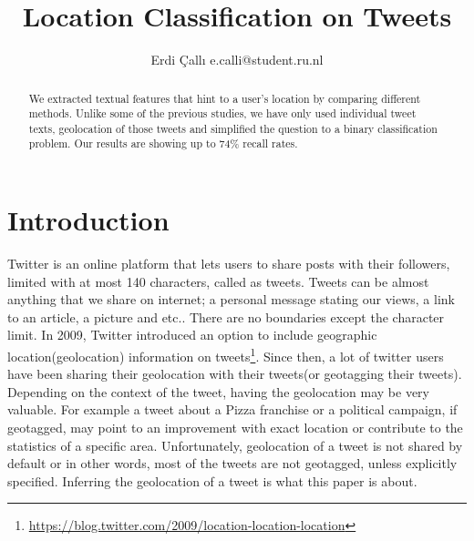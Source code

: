 \documentclass[twoside,11pt]{article}
\begin{document}
\title{Location Classification on Tweets}
\author{\name Erdi \c{C}all{\i}  \email e.calli@student.ru.nl}
\maketitle
\begin{abstract}

We extracted textual features that hint to a user's location by comparing different methods. Unlike some of the previous studies, we have only used individual tweet texts, geolocation of those tweets and simplified the question to a binary classification problem. Our results are showing up to 74\% recall rates.


\end{abstract}


\section{Introduction}

Twitter is an online platform that lets users to share posts with their followers, limited with at most 140 characters, called as tweets. Tweets can be almost anything that we share on internet; a personal message stating our views, a link to an article, a picture and etc.. There are no boundaries except the character limit. In 2009, Twitter introduced an option to include geographic location(geolocation) information on tweets\footnote{\url{https://blog.twitter.com/2009/location-location-location}}. Since then, a lot of twitter users have been sharing their geolocation with their tweets(or geotagging their tweets). Depending on the context of the tweet, having the geolocation may be very valuable. For example a tweet about a Pizza franchise or a political campaign, if geotagged, may point to an improvement with exact location or contribute to the statistics of a specific area. Unfortunately, geolocation of a tweet is not shared by default or in other words, most of the tweets are not geotagged, unless explicitly specified. Inferring the geolocation of a tweet is what this paper is about.
\end{document}
